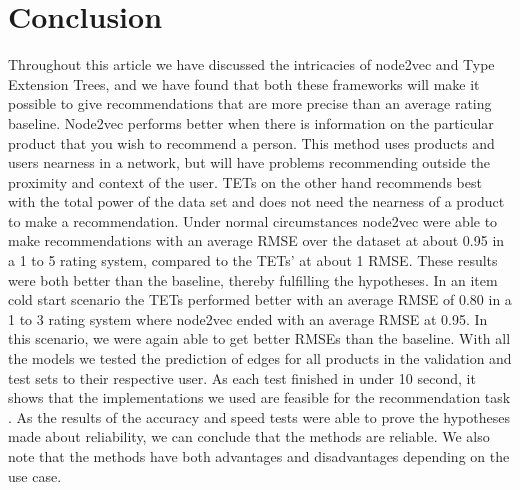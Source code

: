 \section{Conclusion}\label{Sec:Conclusion}
Throughout this article we have discussed the intricacies of node2vec and Type Extension Trees, and we have found that both these frameworks will make it possible to give recommendations that are more precise than an average rating baseline.
Node2vec performs better when there is information on the particular product that you wish to recommend a person.
This method uses products and users nearness in a network, but will have problems recommending outside the proximity and context of the user.
TETs on the other hand recommends best with the total power of the data set and does not need the nearness of a product to make a recommendation.
Under normal circumstances node2vec were able to make recommendations with an average RMSE over the dataset at about 0.95 in a 1 to 5 rating system, compared to the TETs' at about 1 RMSE.
These results were both better than the baseline, thereby fulfilling the hypotheses.
In an item cold start scenario the TETs performed better with an average RMSE of 0.80 in a 1 to 3 rating system where node2vec ended with an average RMSE at 0.95.
In this scenario, we were again able to get better RMSEs than the baseline.
With all the models we tested  the prediction of edges for all products in the validation and test sets to their respective user.
As each test finished in under 10 second, it shows that the implementations we used are feasible for the recommendation task .
As the results of the accuracy and speed tests were able to prove the hypotheses made about reliability, we can conclude that the methods are reliable.
We also note that the methods have both advantages and disadvantages depending on the use case.
